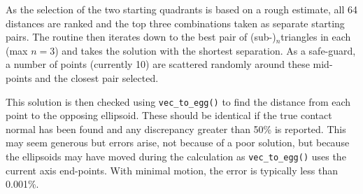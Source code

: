 {{{{{As the selection of the two starting quadrants is based on a rough estimate, all 64 distances are ranked
and the top three combinations taken as separate starting pairs.   The routine then iterates down to the
best pair of (sub-)$_n$triangles in each (max $n=3$) and takes the solution with the shortest separation.
As a safe-guard, a number of points (currently 10) are scattered randomly around these mid-points and
the closest pair selected.  

This solution is then checked using {\tt vec\_to\_egg()} to find the distance from each point to the
opposing ellipsoid.  These should be identical if the true contact normal has been found and any discrepancy
greater than 50\% is reported.  This may seem generous but errors arise, not because of a poor solution,
but because the ellipsoids may have moved during the calculation as {\tt vec\_to\_egg()} uses the current
axis end-points.  With minimal motion, the error is typically less than 0.001\%.

}}}}}
